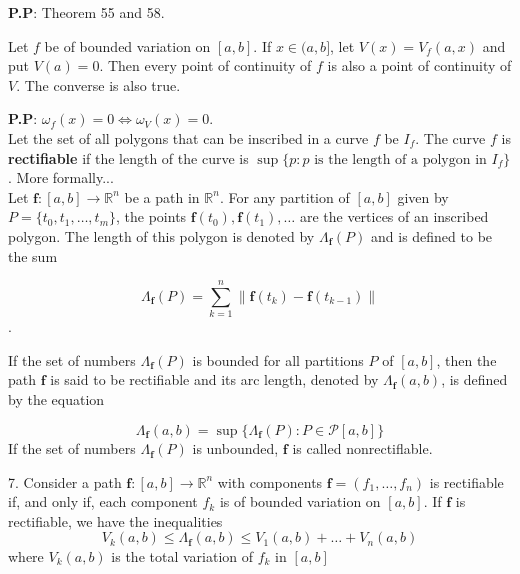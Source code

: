 \documentclass[10pt,a4paper]{book}
\begin{document}
 \noindent \textbf{P.P}: Theorem 55 and 58.
 
 \begin{Thm}
Let $f$ be of bounded variation on $[a, b]$. If $x \in (a, b]$, let $V(x) =
V_f(a, x)$ and put $V(a) = 0$. Then every point of continuity of $f$ is also a point of
continuity of $V$. The converse is also true.

\end{Thm}

\noindent \textbf{P.P}: $\omega_f(x) = 0 \Longleftrightarrow \omega_V(x) = 0$.\\

Let the set of all polygons that can be inscribed in a curve $f$ be $I_f$. The curve $f$ is \textbf{rectifiable} if the length of the curve is $\sup\{p: p \text{ is the length of a polygon in $I_f$}\}$. More formally... \\

Let $\mathbf{f} : [a, b] \rightarrow \mathbb{R}^n$ be a path in $\mathbb{R}^n$. For any partition of $[a, b]$ given by $P = \{t_0, t_1, \dots , t_m\}$, the points $\mathbf{f}(t_0),  \mathbf{f}(t_1), \dots$ are the vertices of an inscribed polygon. The length of this polygon is denoted by $\Lambda_{\mathbf{f}}(P)$ and
is defined to be the sum

$$\Lambda_{\mathbf{f}}(P) = \sum_{k=1}^n  \lVert \mathbf{f}(t_k) - \mathbf{f}(t_{k-1}) \rVert$$.

\begin{deff}

If the set of numbers $\Lambda_{\mathbf{f}}(P)$ is bounded for all partitions $P$ of $[a, b]$, then the path $\mathbf{f}$ is said to be rectifiable and its arc length, denoted by $\Lambda_{\mathbf{f}}(a, b)$, is defined by the equation

$$\Lambda_{\mathbf{f}}(a, b) = \sup\{\Lambda_{\mathbf{f}}(P) : P \in \mathcal{P}[a,b]\}$$
If the set of numbers $\Lambda_{\mathbf{f}}(P)$ is unbounded, $\mathbf{f}$ is called nonrectiflable.
\end{deff}
\begin{Thm}
7. Consider a path $\mathbf{f} : [a, b] \rightarrow \mathbb{R}^n$ with components $\mathbf{f} = (f_1, \dots ,f_n)$ is rectifiable if, and only if, each component $f_k$ is of bounded variation on
$[a, b]$. If $\mathbf{f}$ is rectifiable, we have the inequalities
   $$V_k(a,b) \leq \Lambda_{\mathbf{f}}(a,b) \leq V_1(a,b) + \dots + V_n(a,b)$$
where $V_k(a,b)$  is the total variation of $f_k$ in $[a,b]$ 
\end{Thm}
\end{document}
